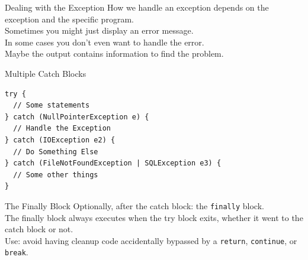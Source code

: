 \documentclass[aspectratio=169]{beamer}
\begin{document}
\begin{frame}{Dealing with the Exception}
\large
How we handle an exception depends on the exception and the specific program. \\ 
\vspace{1em}
Sometimes you might just display an error message. \\
\vspace{1em}
In some cases you don't even want to handle the error. \\
\vspace{1em}
Maybe the output contains information to find the problem. \\
\end{frame}



\begin{frame}[fragile]{Multiple Catch Blocks}
\begin{Verbatim}
try {
  // Some statements   
} catch (NullPointerException e) {
  // Handle the Exception
} catch (IOException e2) {
  // Do Something Else
} catch (FileNotFoundException | SQLException e3) {
  // Some other things
}
\end{Verbatim}
\end{frame}



\begin{frame}{The Finally Block}
\large
Optionally, after the catch block: the \texttt{finally} block.  \\
\vspace{1em}
The finally block always executes when the try block exits, whether it went to the catch block or not.  \\
\vspace{1em}
Use: avoid having cleanup code accidentally bypassed by a \texttt{return}, \texttt{continue}, or \texttt{break}.\\
\end{frame}
\end{document}
